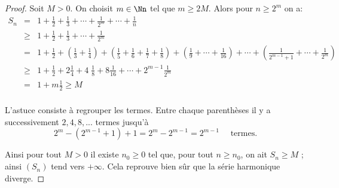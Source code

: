\documentclass[class=report,crop=false]{standalone}
\begin{document}
\begin{proof}
Soit $M>0$. On choisit $m\in \Nn$ tel que $m\ge 2M$. 
Alors pour $n\ge 2^m$ on a:
\begin{eqnarray*}
S_n 
  & = & 1+\frac{1}{2}+\frac{1}{3}+\cdots+\frac{1}{2^m}+\cdots+ \frac{1}{n} \\
  &\ge & 1+\frac{1}{2}+\frac{1}{3}+\cdots+ \frac{1}{2^m} \\
  & = & 1 + \frac{1}{2}+ \left(\frac{1}{3}+\frac{1}{4}\right) 
  +\left(\frac{1}{5}+\frac{1}{6}+\frac{1}{7}+ \frac{1}{8}\right) +\left(\frac{1}{9}+\cdots +\frac{1}{16}\right)+  \cdots
+\left(\frac{1}{2^{m-1}+1}+\cdots + \frac{1}{2^m}\right) \\
 & \ge & 1+\frac{1}{2}+2 \frac{1}{4}+ 4\;\frac{1}{8}+ 8 \frac{1}{16}+\cdots +
2^{m-1} \frac{1}{2^m} \\
&=& 1+m \frac{1}{2}\ge M  \\
\end{eqnarray*}

L'astuce consiste à regrouper les termes. Entre chaque parenthèses il 
y a successivement $2,4,8,...$ termes jusqu'à 
$$2^m-(2^{m-1}+1)+1= 
2^m-2^{m-1}=2^{m-1} \quad \text{ termes.}$$

Ainsi pour tout $M>0$ il existe $n_0 \ge 0$ tel que, pour tout $n \ge n_0$, on ait $S_n \ge M$ ; ainsi
$(S_n)$ tend vers $+\infty$. Cela reprouve bien sûr que la série harmonique diverge.
\end{proof}


\end{document}
